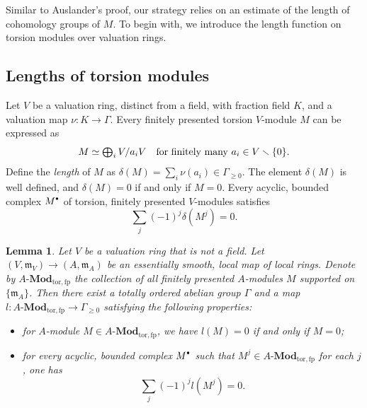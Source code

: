 \documentclass[JEP,XML,SOM,Unicode,published]{cedram}
\newcommand{\sbullet}{{\scriptscriptstyle\bullet}}
\newcommand{\csbullet}{{\raisebox{1pt}{$\sbullet$}}}
\let\ts\textstyle
\let\backslash\smallsetminus
\newcommand{\GG}{\Gamma}
\newcommand{\fm}{\mathfrak{m}}
\let\x\text
\let\q\quad
\theoremstyle{plain}
\newtheorem{lemma-tweak}[subsection]{Lemma}
\theoremstyle{definition}
\begin{document}
Similar to Auslander's proof, our strategy relies on an estimate of the length of cohomology groups of $M$.
To begin with, we introduce the length function on torsion modules over valuation rings.

\subsection{Lengths of torsion modules}\label{delta}
Let $V$ be a valuation ring, distinct from a field, with fraction field $K$, and a valuation map $\nu\colon K\to \GG$. Every finitely presented torsion $V$\nobreakdash-mod\-ule $M$ can be expressed as
\[
\ts \text{$M\simeq \bigoplus_{i}V/a_i V$\q for finitely many $a_i\in V\backslash \{0\}$.}
\]
Define the \emph{length} of $M$ as $ \delta(M)=\sum_i\nu(a_i) \in \Gamma_{\ge 0}$.
The element $\delta(M)$ is well defined, and $\delta(M)=0$ if and only if $M=0$.
Every acyclic, bounded complex $M^{\csbullet}$ of torsion, finitely presented $V$\nobreakdash-mod\-ules satisfies
\[
\ts\sum_j (-1)^j \delta(M^j)=0.
\]

\begin{lemma-tweak} \label{the map l}
Let $V$ be a valuation ring that is not a field. Let $(V,\fm_V)\to (A, \mathfrak{m}_A)$ be an essentially smooth, local map of local rings. Denote by $A\x{-}\mathbf{Mod}_{\mathrm{tor, fp}}$ the collection of all finitely presented $A$\nobreakdash-mod\-ules $M$ supported on $\{\fm_A\}$. Then there exist a totally ordered abelian group $\Gamma$ and a map $l\colon A\x{-}\mathbf{Mod}_{\mathrm{tor, fp}}\to \GG_{\geq 0}$ satisfying the following properties:
\begin{itemize}
\item for $A$\nobreakdash-mod\-ule $M\in A\x{-}\mathbf{Mod}_{\mathrm{tor, fp}}$, we have $l(M)=0$ if and only if $M=0$;
\item for every acyclic, bounded complex $M^{\csbullet}$ such that $M^j\in A\x{-}\mathbf{Mod}_{\mathrm{tor, fp}}$ for each $j$, one has
\[
\ts \sum_j (-1)^j l(M^j)=0.
\]
\end{itemize}
\end{lemma-tweak}
\end{document}
